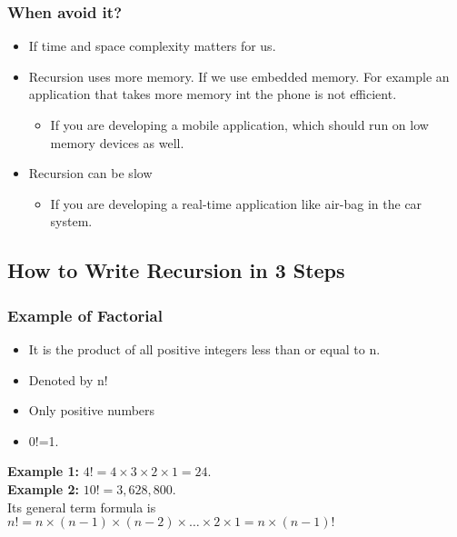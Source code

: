 \documentclass[10pt,letterpaper]{article}
\begin{document}
\subsubsection{When avoid it?}
\begin{itemize}
\item If time and space complexity matters for us.
\item Recursion uses more memory. If we use embedded memory. For example an application that takes more memory int the phone is not efficient.
\begin{itemize}
\item If you are developing a mobile application, which should run on low memory devices as well.
\end{itemize}
\item Recursion can be slow
\begin{itemize}
\item If you are developing a real-time application like air-bag in the car system.
\end{itemize}
\end{itemize}

\subsection{How to Write Recursion in 3 Steps}
\subsubsection{Example of Factorial}
\begin{itemize}
\item It is the product of all positive integers less than or equal to n.
\item Denoted by n!
\item Only positive numbers
\item 0!=1.
\end{itemize}

\textbf{Example 1:} $4!=4 \times 3 \times 2 \times 1 =24$. \\

\textbf{Example 2:} $10!=3,628,800$.\\

Its general term formula is $n! = n \times (n-1) \times (n-2) \times \ldots \times 2 \times 1 = n \times (n-1)!$
\end{document}
